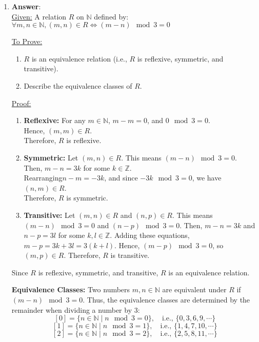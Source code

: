 \documentclass[11pt]{article}
\begin{document}
\begin{enumerate}
\item \textbf{Answer}: \\
\uline{Given:}  
A relation $ R $ on $ \mathbb{N} $ defined by:  \\
    $\forall m, n \in \mathbb{N}, (m, n) \in R \iff (m - n) \mod 3 = 0$

\uline{To Prove:}  
\begin{enumerate}
    \item $ R $ is an equivalence relation (i.e., $ R $ is reflexive, symmetric, and transitive).  
    \item Describe the equivalence classes of $ R $.
\end{enumerate}

\uline{Proof:}
\begin{enumerate}
    \item \textbf{Reflexive:}  
   For any $ m \in \mathbb{N} $, $ m - m = 0 $, and $ 0 \mod 3 = 0 $.  \\
   Hence, $ (m, m) \in R $. \\ 
   Therefore, $ R $ is reflexive.
    \item \textbf{Symmetric:}  
   Let $ (m, n) \in R $. This means $ (m - n) \mod 3 = 0 $.  \\
   Then, $ m - n = 3k $ for some $ k \in \mathbb{Z} $.  \\
   Rearranging$ n - m = -3k $, and since $ -3k \mod 3 = 0 $, we have $ (n, m) \in R $.  \\
   Therefore, $ R $ is symmetric.
    \\
    \item \textbf{Transitive:}  
   Let $ (m, n) \in R $ and $ (n, p) \in R $.  
   This means $ (m - n) \mod 3 = 0 $ and $ (n - p) \mod 3 = 0 $.  
   Then, $ m - n = 3k $ and $ n - p = 3l $ for some $ k, l \in \mathbb{Z} $.  
   Adding these equations, $ m - p = 3k + 3l = 3(k + l) $.  
   Hence, $ (m - p) \mod 3 = 0 $, so $ (m, p) \in R $.  
   Therefore, $ R $ is transitive.
\end{enumerate}

Since $ R $ is reflexive, symmetric, and transitive, $ R $ is an equivalence relation.

\textbf{Equivalence Classes:}  
Two numbers $ m, n \in \mathbb{N} $ are equivalent under $ R $ if $ (m - n) \mod 3 = 0 $.  
Thus, the equivalence classes are determined by the remainder when dividing a number by 3:  
\[
[0] = \{ n \in \mathbb{N} \mid n \mod 3 = 0 \}, \quad \text{i.e., } \{ 0, 3, 6, 9, \cdots \}
\]
\[
[1] = \{ n \in \mathbb{N} \mid n \mod 3 = 1 \}, \quad \text{i.e., } \{ 1, 4, 7, 10, \cdots \}
\]
\[
[2] = \{ n \in \mathbb{N} \mid n \mod 3 = 2 \}, \quad \text{i.e., } \{ 2, 5, 8, 11, \cdots \}
\]


\end{enumerate}
\end{document}
